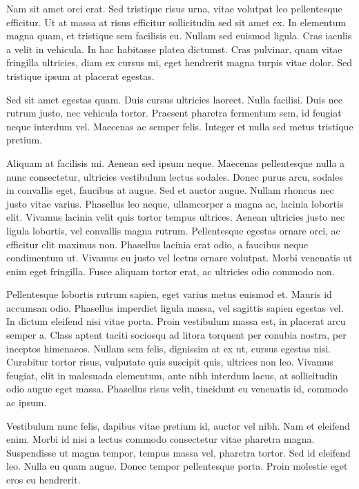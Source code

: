 \documentclass{homework}
\begin{document}
Nam sit amet orci erat. Sed tristique risus urna, vitae volutpat leo pellentesque efficitur. Ut at massa at risus efficitur sollicitudin sed sit amet ex. In elementum magna quam, et tristique sem facilisis eu. Nullam sed euismod ligula. Cras iaculis a velit in vehicula. In hac habitasse platea dictumst. Cras pulvinar, quam vitae fringilla ultricies, diam ex cursus mi, eget hendrerit magna turpis vitae dolor. Sed tristique ipsum at placerat egestas.

Sed sit amet egestas quam. Duis cursus ultricies laoreet. Nulla facilisi. Duis nec rutrum justo, nec vehicula tortor. Praesent pharetra fermentum sem, id feugiat neque interdum vel. Maecenas ac semper felis. Integer et nulla sed metus tristique pretium.

Aliquam at facilisis mi. Aenean sed ipsum neque. Maecenas pellentesque nulla a nunc consectetur, ultricies vestibulum lectus sodales. Donec purus arcu, sodales in convallis eget, faucibus at augue. Sed et auctor augue. Nullam rhoncus nec justo vitae varius. Phasellus leo neque, ullamcorper a magna ac, lacinia lobortis elit. Vivamus lacinia velit quis tortor tempus ultrices. Aenean ultricies justo nec ligula lobortis, vel convallis magna rutrum. Pellentesque egestas ornare orci, ac efficitur elit maximus non. Phasellus lacinia erat odio, a faucibus neque condimentum ut. Vivamus eu justo vel lectus ornare volutpat. Morbi venenatis ut enim eget fringilla. Fusce aliquam tortor erat, ac ultricies odio commodo non.

Pellentesque lobortis rutrum sapien, eget varius metus euismod et. Mauris id accumsan odio. Phasellus imperdiet ligula massa, vel sagittis sapien egestas vel. In dictum eleifend nisi vitae porta. Proin vestibulum massa est, in placerat arcu semper a. Class aptent taciti sociosqu ad litora torquent per conubia nostra, per inceptos himenaeos. Nullam sem felis, dignissim at ex ut, cursus egestas nisi. Curabitur tortor risus, vulputate quis suscipit quis, ultrices non leo. Vivamus feugiat, elit in malesuada elementum, ante nibh interdum lacus, at sollicitudin odio augue eget massa. Phasellus risus velit, tincidunt eu venenatis id, commodo ac ipsum.

Vestibulum nunc felis, dapibus vitae pretium id, auctor vel nibh. Nam et eleifend enim. Morbi id nisi a lectus commodo consectetur vitae pharetra magna. Suspendisse ut magna tempor, tempus massa vel, pharetra tortor. Sed id eleifend leo. Nulla eu quam augue. Donec tempor pellentesque porta. Proin molestie eget eros eu hendrerit.
\end{document}
